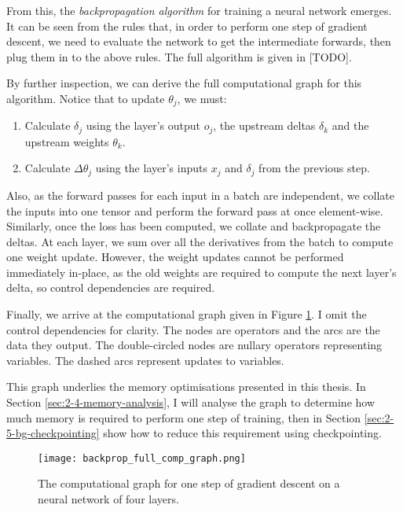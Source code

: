 From this, the \textit{backpropagation algorithm} for training a neural network emerges.
It can be seen from the rules that, in order to perform one step of gradient descent, we need to evaluate the network to get the intermediate forwards, then plug them in to the above rules.
The full algorithm is given in  [TODO].

By further inspection, we can derive the full computational graph for this algorithm.
Notice that to update \(\theta_j\), we must:
\begin{enumerate}[topsep=0.2em]
    \item Calculate \(\delta_j\) using the layer's output \(o_j\), the upstream deltas \(\delta_k\) and the upstream weights \(\theta_k\).
    \item Calculate \(\Delta\theta_j\) using the layer's inputs \(x_j\) and \(\delta_j\) from the previous step.
\end{enumerate}

Also, as the forward passes for each input in a batch are independent, we collate the inputs into one tensor and perform the forward pass at once element-wise.
Similarly, once the loss has been computed, we collate and backpropagate the deltas.
At each layer, we sum over all the derivatives from the batch to compute one weight update.
However, the weight updates cannot be performed immediately in-place, as the old weights are required to compute the next layer's delta, so control dependencies are required.

Finally, we arrive at the computational graph given in Figure \ref{fig:2-nn-comp-graph}.
I omit the control dependencies for clarity.
The nodes are operators and the arcs are the data they output.
The double-circled nodes are nullary operators representing variables.
The dashed arcs represent updates to variables. 

This graph underlies the memory optimisations presented in this thesis.
In Section \ref{sec:2-4-memory-analysis}, I will analyse the graph to determine how much memory is required to perform one step of training,
then in Section \ref{sec:2-5-bg-checkpointing} show how to reduce this requirement using checkpointing.

\begin{figure}[t]
    \centering
    \texttt{[image: backprop\_full\_comp\_graph.png]}
    \caption{The computational graph for one step of gradient descent on a neural network of four layers.}
    \label{fig:2-nn-comp-graph}
\end{figure}

